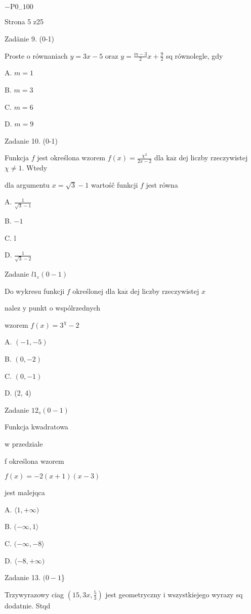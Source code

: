 \documentclass[a4paper,12pt]{article}
\begin{document}
$-\mathrm{P}0_{-}100$

Strona 5 z25





Zadänie 9. (0-1)

Proste o równaniach $y=3x-5$ oraz $y=\displaystyle \frac{m-3}{2}x+\frac{9}{2}$ sq równolegle, gdy

A. $m=1$

B. $m=3$

C. $m=6$

D. $m=9$

Zadanie 10. (0-1)

Funkcja $f$ jest określona wzorem $f(x)=\displaystyle \frac{\chi^{2}}{2x-2}$ dla $\mathrm{k}\mathrm{a}\dot{\mathrm{z}}$ dej liczby rzeczywistej $\chi\neq 1$. Wtedy

dla argumentu $x=\sqrt{3}-1$ wartośč funkcji $f$ jest równa

A. $\displaystyle \frac{1}{\sqrt{3}-1}$

B. $-1$

C. l

D. $\displaystyle \frac{1}{\sqrt{3}-2}$

Zadanie $l1_{\varepsilon}(0-1)$

Do wykresu funkcji $f$ określonej dla $\mathrm{k}\mathrm{a}\dot{\mathrm{z}}$ dej liczby rzeczywistej $x$

nalez $\mathrm{y}$ punkt o wspólrzednych

wzorem $f(x)=3^{\chi}-2$

A. $(-1,-5)$

B. $(0,-2)$

C. $(0,-1)$

D. (2, 4)

Zadanie $12_{s}(0-1)$

Funkcja kwadratowa

w przedziale

f określona wzorem

$f(x)=-2(x+1)(x-3)$

jest malejqca

A. $\langle 1, +\infty)$

B. $(-\infty,  1\rangle$

C. $(-\infty, -8\rangle$

D. $\langle-8, +\infty)$

Zadanie 13. $(0-1$\}

Trzywyrazowy ciag $(15,3x,\displaystyle \frac{5}{3})$ jest geometryczny i wszystkiejego wyrazy sq dodatnie. Stqd
\end{document}
